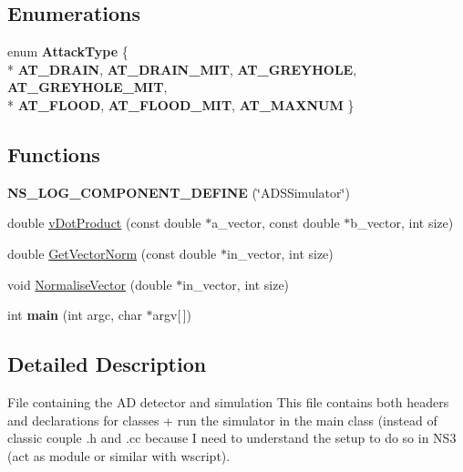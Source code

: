 \subsection*{Enumerations}
\begin{DoxyCompactItemize}
\item 
\hypertarget{ads-simulator_8cc_a904b2f9c8f3951116c343784c59d6afe}{}enum {\bfseries Attack\+Type} \{ \\*
{\bfseries A\+T\+\_\+\+D\+R\+A\+I\+N}, 
{\bfseries A\+T\+\_\+\+D\+R\+A\+I\+N\+\_\+\+M\+I\+T}, 
{\bfseries A\+T\+\_\+\+G\+R\+E\+Y\+H\+O\+L\+E}, 
{\bfseries A\+T\+\_\+\+G\+R\+E\+Y\+H\+O\+L\+E\+\_\+\+M\+I\+T}, 
\\*
{\bfseries A\+T\+\_\+\+F\+L\+O\+O\+D}, 
{\bfseries A\+T\+\_\+\+F\+L\+O\+O\+D\+\_\+\+M\+I\+T}, 
{\bfseries A\+T\+\_\+\+M\+A\+X\+N\+U\+M}
 \}\label{ads-simulator_8cc_a904b2f9c8f3951116c343784c59d6afe}

\end{DoxyCompactItemize}
\subsection*{Functions}
\begin{DoxyCompactItemize}
\item 
\hypertarget{ads-simulator_8cc_a796f987c7a114e4a30f99022fac1af0d}{}{\bfseries N\+S\+\_\+\+L\+O\+G\+\_\+\+C\+O\+M\+P\+O\+N\+E\+N\+T\+\_\+\+D\+E\+F\+I\+N\+E} (\char`\"{}A\+D\+S\+Simulator\char`\"{})\label{ads-simulator_8cc_a796f987c7a114e4a30f99022fac1af0d}

\item 
double \hyperlink{ads-simulator_8cc_a1c0cb5cd68640a4d58b0bd7391e2326f}{v\+Dot\+Product} (const double $\ast$a\+\_\+vector, const double $\ast$b\+\_\+vector, int size)
\item 
double \hyperlink{ads-simulator_8cc_ab38de828d95e44f3fe95c036258e9598}{Get\+Vector\+Norm} (const double $\ast$in\+\_\+vector, int size)
\item 
void \hyperlink{ads-simulator_8cc_af56665bff891161a0c14f69334ba7dc9}{Normalise\+Vector} (double $\ast$in\+\_\+vector, int size)
\item 
\hypertarget{ads-simulator_8cc_a0ddf1224851353fc92bfbff6f499fa97}{}int {\bfseries main} (int argc, char $\ast$argv\mbox{[}$\,$\mbox{]})\label{ads-simulator_8cc_a0ddf1224851353fc92bfbff6f499fa97}

\end{DoxyCompactItemize}


\subsection{Detailed Description}
File containing the A\+D detector and simulation This file contains both headers and declarations for classes + run the simulator in the main class (instead of classic couple .h and .cc because I need to understand the setup to do so in N\+S3 (act as module or similar with wscript). 



